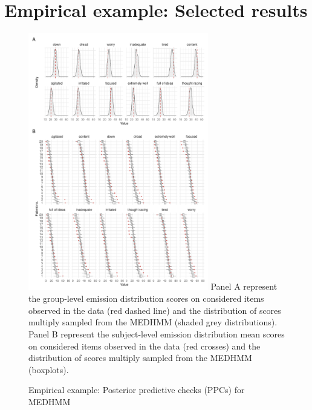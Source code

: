 \section{Empirical example: Selected results}
\begin{figure}[h]
\centering
\caption{Empirical example: Posterior predictive checks (PPCs) for MEDHMM}
\includegraphics[width=0.7\textwidth]{graphics/ppc_mean_emiss.pdf}
\flushleft
\footnotesize
\justifying
 Panel A represent the group-level emission distribution scores on considered items observed in the data (red dashed line) and the distribution of scores multiply sampled from the MEDHMM (shaded grey distributions). Panel B represent the subject-level emission distribution mean scores on considered items observed in the data (red crosses) and the distribution of scores multiply sampled from the MEDHMM (boxplots).\label{ppc_out_mean_medhmm}
\end{figure}

